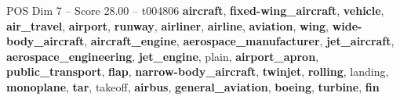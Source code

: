 \begin{textsample}{POS Dim 7 – Score 28.00 – t004806}  \label{ex:f7_pos_004}
\textbf{aircraft}, \textbf{fixed-wing\_aircraft}, \textbf{vehicle}, \textbf{air\_travel}, \textbf{airport}, \textbf{runway}, \textbf{airliner}, \textbf{airline}, \textbf{aviation}, \textbf{wing}, \textbf{wide-body\_aircraft}, \textbf{aircraft\_engine}, \textbf{aerospace\_manufacturer}, \textbf{jet\_aircraft}, \textbf{aerospace\_engineering}, \textbf{jet\_engine}, plain, \textbf{airport\_apron}, \textbf{public\_transport}, \textbf{flap}, \textbf{narrow-body\_aircraft}, \textbf{twinjet}, \textbf{rolling}, landing, \textbf{monoplane}, \textbf{tar}, takeoff, \textbf{airbus}, \textbf{general\_aviation}, \textbf{boeing}, \textbf{turbine}, \textbf{fin}

\end{textsample}
